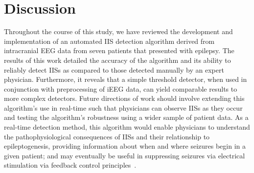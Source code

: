 \documentclass[letterpaper, 10pt, conference]{ieeeconf}      %
\begin{document}


\section{Discussion}
Throughout the course of this study, we have reviewed the development and implementation of an automated IIS detection algorithm derived from intracranial EEG data from seven patients that presented with epilepsy. The results of this work detailed the accuracy of the algorithm and its ability to reliably detect IISs as compared to those detected manually by an expert physician. Furthermore, it reveals that a simple threshold detector, when used in conjunction with preprocessing of iEEG data, can yield comparable results to more complex detectors. Future directions of work should involve extending this algorithm's use in real-time such that physicians can observe IISs as they occur and testing the algorithm's robustness using a wider sample of patient data. As a real-time detection method, this algorithm would enable physicians to understand the pathophysiological consequences of IISs and their relationship to epileptogenesis, providing information about when and where seizures begin in a given patient; and may eventually be useful in suppressing seizures via electrical stimulation via feedback control principles~\cite{ehrens}.
\end{document}
